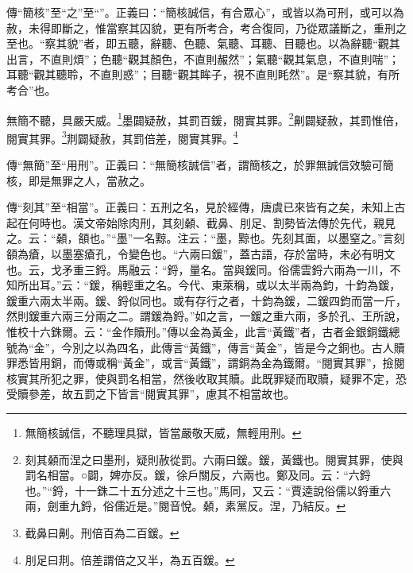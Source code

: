 {\noindent\zhuan{}\fzbyks 傳“簡核”至“之”至“”。正義曰：“簡核誠信，有合眾心”，或皆以為可刑，或可以為赦，未得即斷之，惟當察其囚貌，更有所考合，考合復同，乃從眾議斷之，重刑之至也。“察其貌”者，即五聽，辭聽、色聽、氣聽、耳聽、目聽也。以為辭聽“觀其出言，不直則煩”；色聽“觀其顏色，不直則赧然”；氣聽“觀其氣息，不直則喘”；耳聽“觀其聽聆，不直則惑”；目聽“觀其眸子，視不直則眊然”。是“察其貌，有所考合”也。 \par}

無簡不聽，具嚴天威。\footnote{無簡核誠信，不聽理具獄，皆當嚴敬天威，無輕用刑。}墨闢疑赦，其罰百鍰，閱實其罪。\footnote{刻其顙而涅之曰墨刑，疑則赦從罰。六兩曰鍰。鍰，黃鐵也。閱實其罪，使與罰名相當。○闢，婢亦反。鍰，徐戶關反，六兩也。鄭及同。云：“六鋝也。”“鋝，十一銖二十五分述之十三也。”馬同，又云：“賈逵說俗儒以鋝重六兩，劍重九鋝，俗儒近是。”閱音悅。顙，素黨反。涅，乃結反。}劓闢疑赦，其罰惟倍，閱實其罪。\footnote{截鼻曰劓。刑倍百為二百鍰。}剕闢疑赦，其罰倍差，閱實其罪。\footnote{刖足曰剕。倍差謂倍之又半，為五百鍰。}


{\noindent\zhuan{}\fzbyks 傳“無簡”至“用刑”。正義曰：“無簡核誠信”者，謂簡核之，於罪無誠信效驗可簡核，即是無罪之人，當赦之。 \par}

{\noindent\zhuan{}\fzbyks 傳“刻其”至“相當”。正義曰：五刑之名，見於經傳，唐虞已來皆有之矣，未知上古起在何時也。漢文帝始除肉刑，其刻顙、截鼻、刖足、割勢皆法傳於先代，親見之。云：“顙，頟也。”“墨”一名黥。注云：“墨，黥也。先刻其面，以墨窒之。”言刻頟為瘡，以墨塞瘡孔，令變色也。“六兩曰鍰”，蓋古語，存於當時，未必有明文也。云，戈矛重三鋝。馬融云：“鋝，量名。當與鍰同。俗儒雲鋝六兩為一川，不知所出耳。”云：“鍰，稱輕重之名。今代、東萊稱，或以太半兩為鈞，十鈞為鍰，鍰重六兩太半兩。鍰、鋝似同也。或有存行之者，十鈞為鍰，二鍰四鈞而當一斤，然則鍰重六兩三分兩之二。謂鍰為鋝。”如之言，一鍰之重六兩，多於孔、王所說，惟校十六銖爾。云：“金作贖刑。”傳以金為黃金，此言“黃鐵”者，古者金銀銅鐵總號為“金”，今別之以為四名，此傳言“黃鐵”，傳言“黃金”，皆是今之銅也。古人贖罪悉皆用銅，而傳或稱“黃金”，或言“黃鐵”，謂銅為金為鐵爾。“閱實其罪”，撿閱核實其所犯之罪，使與罰名相當，然後收取其贖。此既罪疑而取贖，疑罪不定，恐受贖參差，故五罰之下皆言“閱實其罪”，慮其不相當故也。 \par}

